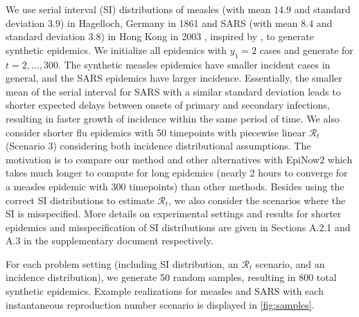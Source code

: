 \documentclass[10pt,letterpaper]{article}
\def\calR{\mathcal{R}}
\begin{document}
We use serial interval (SI) distributions of measles (with mean $14.9$ and
standard deviation $3.9$) in Hagelloch, Germany in 1861
\cite{groendyke2011bayesian} and SARS (with mean $8.4$ and standard deviation
$3.8$) in Hong Kong in 2003 \cite{lipsitch2003transmission}, inspired by
\cite{cori2013new}, to generate synthetic epidemics. We initialize all epidemics
with $y_1=2$ cases and generate for $t=2,\ldots,300$. The synthetic measles
epidemics have smaller incident cases in general, and the SARS epidemics have
larger incidence. Essentially, the smaller mean of the serial interval for SARS
with a similar standard deviation leads to shorter expected delays between
onsets of primary and secondary infections, resulting in faster growth of
incidence within the same period of time. We also consider shorter flu epidemics
with 50 timepoints with piecewise linear $\calR_t$ (Scenario 3) considering both
incidence distributional assumptions. The motivation is to compare our method
and other alternatives with EpiNow2 which takes much longer to compute for long
epidemics (nearly 2 hours to converge for a measles epidemic with 300
timepoints) than other methods. Besides using the correct SI distributions to
estimate $\calR_t$, we also consider the scenarios where the SI is misspecified.
More details on experimental settings and results for shorter epidemics and
misspecification of SI distributions are given in Sections A.2.1 and A.3 in the
supplementary document respectively. 

For each problem setting (including SI distribution, an $\calR_t$ scenario, and
an incidence distribution), we generate 50 random samples, resulting in $800$
total synthetic epidemics. Example realizations for measles and SARS with each
instantaneous reproduction number scenario is displayed in
\autoref{fig:samples}. 
\end{document}
